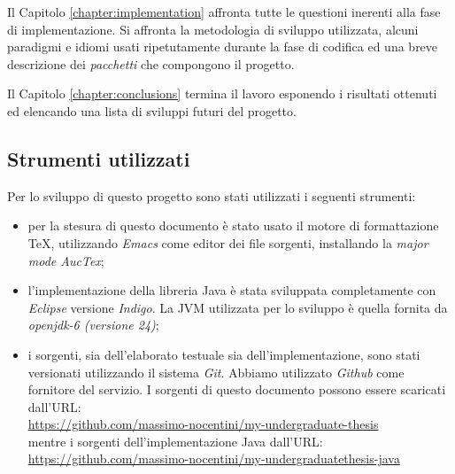 Il Capitolo \ref{chapter:implementation} affronta tutte le questioni
inerenti alla fase di implementazione. Si affronta la metodologia di
sviluppo utilizzata, alcuni paradigmi e idiomi usati ripetutamente
durante la fase di codifica ed una breve descrizione dei
\emph{pacchetti} che compongono il progetto.

Il Capitolo \ref{chapter:conclusions} termina il lavoro esponendo i
risultati ottenuti ed elencando una lista di sviluppi futuri del
progetto.

\subsection{Strumenti utilizzati}
Per lo sviluppo di questo progetto sono stati utilizzati i seguenti
strumenti:
\begin{itemize}
\item per la stesura di questo documento \`e stato usato il motore di
  formattazione \TeX, utilizzando \emph{Emacs} come editor dei file
  sorgenti, installando la \emph{major mode AucTex};
\item l'implementazione della libreria Java \`e stata sviluppata
  completamente con \emph{Eclipse} versione \emph{Indigo}. La JVM
  utilizzata per lo sviluppo \`e quella fornita da \emph{openjdk-6
    (versione 24)};
\item i sorgenti, sia dell'elaborato testuale sia
  dell'implementazione, sono stati versionati utilizzando il sistema
  \emph{Git}. Abbiamo utilizzato \emph{Github} come fornitore del
  servizio. I sorgenti di questo documento possono essere scaricati
  dall'URL:\\
  \href{https://github.com/massimo-nocentini/my-undergraduate-thesis}{
    https://github.com/massimo-nocentini/my-undergraduate-thesis}\\
  mentre i sorgenti dell'implementazione Java dall'URL:\\
  \href{https://github.com/massimo-nocentini/my-undergraduatethesis-java}{
    https://github.com/massimo-nocentini/my-undergraduatethesis-java}
\end{itemize}

